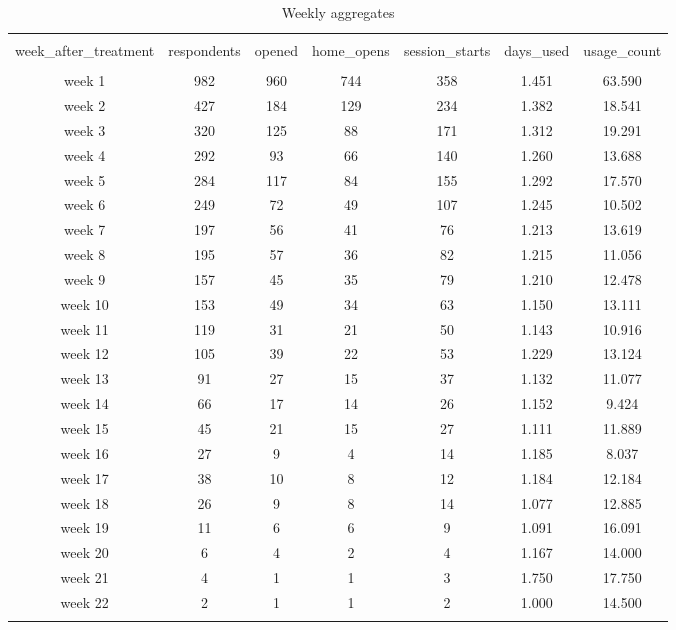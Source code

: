 
\begin{table}[!htbp] \centering 
  \caption{Weekly aggregates} 
  \label{tbl:weekly_aggregates} 
\begin{tabular}{@{\extracolsep{5pt}} ccccccc} 
\\[-1.8ex]\hline 
\hline \\[-1.8ex] 
week\_after\_treatment & respondents & opened & home\_opens & session\_starts & days\_used & usage\_count \\ 
\hline \\[-1.8ex] 
week 1 & 982 & 960 & 744 & 358 & 1.451 & 63.590 \\ 
week 2 & 427 & 184 & 129 & 234 & 1.382 & 18.541 \\ 
week 3 & 320 & 125 &  88 & 171 & 1.312 & 19.291 \\ 
week 4 & 292 &  93 &  66 & 140 & 1.260 & 13.688 \\ 
week 5 & 284 & 117 &  84 & 155 & 1.292 & 17.570 \\ 
week 6 & 249 &  72 &  49 & 107 & 1.245 & 10.502 \\ 
week 7 & 197 &  56 &  41 &  76 & 1.213 & 13.619 \\ 
week 8 & 195 &  57 &  36 &  82 & 1.215 & 11.056 \\ 
week 9 & 157 &  45 &  35 &  79 & 1.210 & 12.478 \\ 
week 10 & 153 &  49 &  34 &  63 & 1.150 & 13.111 \\ 
week 11 & 119 &  31 &  21 &  50 & 1.143 & 10.916 \\ 
week 12 & 105 &  39 &  22 &  53 & 1.229 & 13.124 \\ 
week 13 &  91 &  27 &  15 &  37 & 1.132 & 11.077 \\ 
week 14 &  66 &  17 &  14 &  26 & 1.152 &  9.424 \\ 
week 15 &  45 &  21 &  15 &  27 & 1.111 & 11.889 \\ 
week 16 &  27 &   9 &   4 &  14 & 1.185 &  8.037 \\ 
week 17 &  38 &  10 &   8 &  12 & 1.184 & 12.184 \\ 
week 18 &  26 &   9 &   8 &  14 & 1.077 & 12.885 \\ 
week 19 &  11 &   6 &   6 &   9 & 1.091 & 16.091 \\ 
week 20 &   6 &   4 &   2 &   4 & 1.167 & 14.000 \\ 
week 21 &   4 &   1 &   1 &   3 & 1.750 & 17.750 \\ 
week 22 &   2 &   1 &   1 &   2 & 1.000 & 14.500 \\ 
\hline \\[-1.8ex] 
\end{tabular} 
\end{table} 
